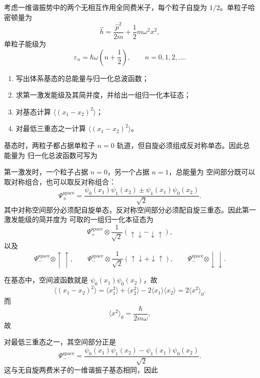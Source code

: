\begin{question}
考虑一维谐振势中的两个无相互作用全同费米子，每个粒子自旋为 $1/2$。单粒子哈密顿量为
\[
\hat h=\frac{\hat p^2}{2m}+\frac12 m\omega^2 x^2,
\]
单粒子能级为
\[
\varepsilon_n=\hbar\omega\left(n+\frac12\right),
\qquad n=0,1,2,\dots.
\]

\begin{enumerate}[label=(\arabic*),leftmargin=2.5em]
  \item 写出体系基态的总能量与归一化总波函数；
  \item 求第一激发能级及其简并度，并给出一组归一化本征态；
  \item 对基态计算 $\langle (x_1-x_2)^2\rangle$；
  \item 对最低三重态之一计算 $\langle (x_1-x_2)^2\rangle$。
\end{enumerate}

\begin{solution}
基态时，两粒子都占据单粒子 $n=0$ 轨道，但自旋必须组成反对称单态。因此总能量为
归一化总波函数可写为

第一激发时，一个粒子占据 $n=0$，另一个占据 $n=1$，总能量为
空间部分既可以取对称组合，也可以取反对称组合：
\[
\Psi_{\pm}^{\text{space}}=\frac{\psi_0(x_1)\psi_1(x_2)\pm \psi_1(x_1)\psi_0(x_2)}{\sqrt2}.
\]
其中对称空间部分必须配自旋单态，反对称空间部分必须配自旋三重态。因此第一激发能级的简并度为
可取的一组归一化本征态为
\[
\Psi_+^{\text{space}}\otimes \frac{1}{\sqrt2}(\uparrow\downarrow-\downarrow\uparrow),
\]
以及
\[
\Psi_-^{\text{space}}\otimes \uparrow\uparrow,
\qquad
\Psi_-^{\text{space}}\otimes \frac{1}{\sqrt2}(\uparrow\downarrow+\downarrow\uparrow),
\qquad
\Psi_-^{\text{space}}\otimes \downarrow\downarrow.
\]

在基态中，空间波函数就是 $\psi_0(x_1)\psi_0(x_2)$，故
\[
\langle (x_1-x_2)^2\rangle=\langle x_1^2\rangle+\langle x_2^2\rangle-2\langle x_1\rangle\langle x_2\rangle=2\langle x^2\rangle_0.
\]
而
\[
\langle x^2\rangle_0=\frac{\hbar}{2m\omega},
\]
故

对最低三重态之一，其空间部分正是
\[
\Psi_-^{\text{space}}=\frac{\psi_0(x_1)\psi_1(x_2)-\psi_1(x_1)\psi_0(x_2)}{\sqrt2}.
\]
这与无自旋两费米子的一维谐振子基态相同，因此
\end{solution}
\end{question}

